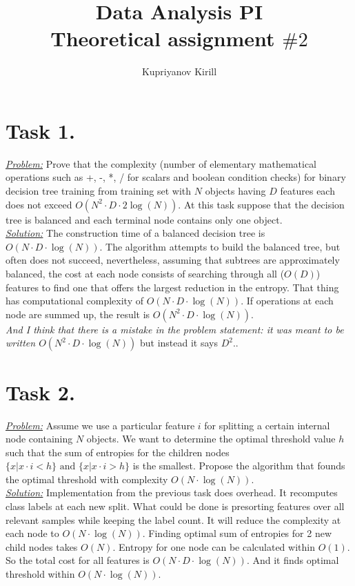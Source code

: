 \documentclass[a4paper,12pt]{article}
\author{Kupriyanov Kirill}
\title{Data Analysis PI\\Theoretical assignment $\#2$}
\date{}
\begin{document}
\maketitle
\thispagestyle{empty}
\newpage
\section*{Task 1.}
\underline{\textit{Problem:}} Prove that the complexity (number of elementary mathematical operations such as +, -, *, / for scalars
and boolean condition checks) for binary decision tree training from training set with $N$ objects having
$D$ features each does not exceed $O(N^2\cdot D\cdot 2\log(N))$. At this task suppose that the decision tree is balanced
and each terminal node contains only one object.\\
\newline
\underline{\textit{Solution:}} The construction time of a balanced
decision tree is \(O(N\cdot D\cdot \log(N))\). The algorithm attempts to build
the balanced tree, but often does not succeed, nevertheless, assuming that
subtrees are approximately balanced, the cost at each node consists of
searching through all (\(O(D)\)) features to find one that offers the largest
reduction in the entropy. That thing has computational complexity of
\(O(N\cdot D \cdot \log(N))\). If operations at each node are summed up, the
result is \(O(N^2\cdot D\cdot \log(N))\). \\
\newline
\textit{And I think that there is a mistake in the problem statement: it was meant to be written \(O(N^2\cdot D\cdot \log(N))\)} but instead it says $D^2$..

\newpage
\section*{Task 2.}
\underline{\textit{Problem:}} Assume we use a particular feature \(i\) for
splitting a certain internal node containing \(N\) objects. We
want to determine the optimal threshold value \(h
\) such that the sum of entropies for the children nodes
\(\{x|x\cdot i < h\} \text{ and } \{x|x\cdot i > h\}\) is the smallest. Propose the algorithm that founds the optimal threshold
with complexity \(O(N\cdot \log(N))\).\\
\newline
\underline{\textit{Solution:}} Implementation from the previous task does
overhead. It recomputes class labels at each new split. What could be done is
presorting features over all relevant samples while keeping the label count. It
will reduce the complexity at each node to \(O(N\cdot \log(N))\). Finding
optimal sum of entropies for 2 new child nodes takes \(O(N)\). Entropy for one
node can be calculated within \(O(1)\).\\
So the total cost for all features is \(O(N\cdot D\cdot \log(N))\). And it finds optimal threshold within \(O(N\cdot \log(N))\).
\end{document}
